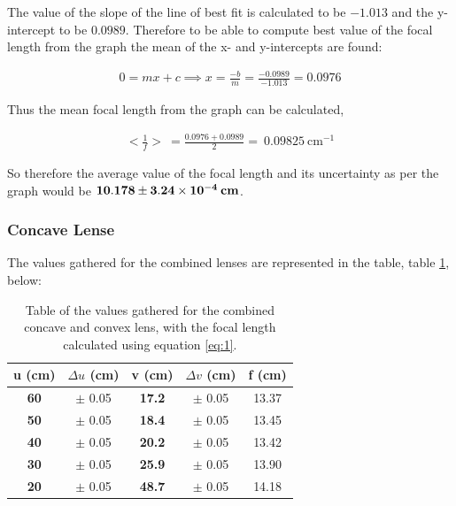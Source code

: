 \documentclass[12pt]{article}
\begin{document}
The value of the slope of the line of best fit is calculated to be $-1.013$ and the y-intercept to be $0.0989$. Therefore to be able to compute best value of the focal length from the graph 
the mean of the x- and y-intercepts are found:

\vspace{-1.5em}
\begin{gather*}
    0 = mx+c \implies x = \frac{-b}{m} = \frac{-0.0989}{-1.013}= 0.0976
\end{gather*}

Thus the mean focal length from the graph can be calculated,

\vspace{-1.5em}
\begin{gather*}
    <\frac{1}{f}> \: = \frac{0.0976 + 0.0989}{2} = \: 0.09825 \: \text{cm}^{-1}
\end{gather*}

So therefore the average value of the focal length and its uncertainty as per the graph would be $\mathbf{10.178 \pm 3.24 \times 10^{-4} \: \text{\textbf{cm}}}$.

\subsubsection{Concave Lense} \label{sec:3.1.2}

The values gathered for the combined lenses are represented in the table, table \ref{tab:4}, below:

\begin{table}[H]
    \centering

    \begin{tabular}{|c|c|c|c|c|}
    \hline
    \textbf{u (cm)} & $\Delta u$ (cm) & \textbf{v (cm)} & $\Delta v$ (cm) & f (cm) \\ \hline
    \textbf{60}     & $\pm$ 0.05      & \textbf{17.2}   & $\pm$ 0.05      & 13.37  \\ \hline
    \textbf{50}     & $\pm$ 0.05      & \textbf{18.4}   & $\pm$ 0.05      & 13.45  \\ \hline
    \textbf{40}     & $\pm$ 0.05      & \textbf{20.2}   & $\pm$ 0.05      & 13.42  \\ \hline
    \textbf{30}     & $\pm$ 0.05      & \textbf{25.9}   & $\pm$ 0.05      & 13.90  \\ \hline
    \textbf{20}     & $\pm$ 0.05      & \textbf{48.7}   & $\pm$ 0.05      & 14.18  \\ \hline
    \end{tabular}

    \caption{\centering Table of the values gathered for the combined concave and convex lens, with the focal length calculated using equation \ref{eq:1}.}
    \label{tab:4}
\end{table}
\end{document}
